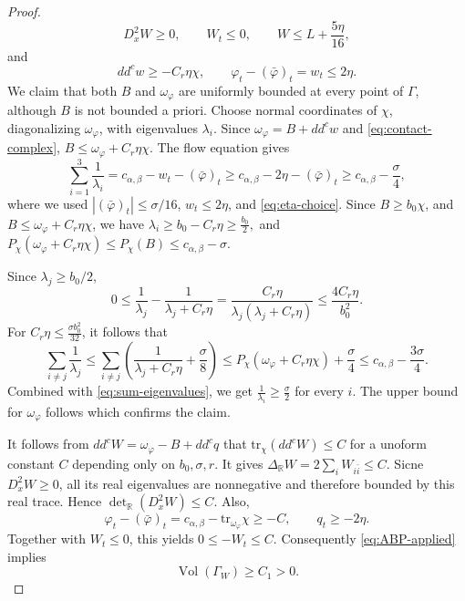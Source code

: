 \documentclass[reqno]{amsart}
\theoremstyle{remark}
\def\R{\mathbb{R}}
\def\tr{\text{tr}}
\newcommand{\ddc}{dd^c}
\newcommand{\cab}{c_{\alpha,\beta}}
\theoremstyle{plain}
\begin{document}
\begin{proof}
\begin{equation}
 D_x^2W\geq0,\qquad W_t\leq0,\qquad
 W\leq L+\frac{5\eta}{16},
\end{equation}
and
\begin{equation}\label{eq:contact-complex}
 \ddc w\geq-C_r\eta\chi,\qquad
 \varphi_t-(\bar{\varphi})_t=w_t\leq2\eta.
\end{equation}
We claim that both $B$ and $\omega_\varphi$ are uniformly bounded at every point of $\Gamma$, although $B$ is not bounded a priori.    Choose normal coordinates of $\chi$, diagonalizing $\omega_\varphi$, with eigenvalues $\lambda_i$. Since $\omega_\varphi=B+dd^c w$ and \eqref{eq:contact-complex}, $B\leq \omega_\varphi+C_r\eta\chi$. The flow equation gives \begin{equation}\label{eq:sum-eigenvalues}
\sum_{i=1}^3\frac{1}{\lambda_i}=\cab-w_t-(\bar{\varphi})_t\geq \cab-2\eta-(\bar{\varphi})_t\geq\cab-\frac{\sigma}{4},
\end{equation}where we used $|(\bar{\varphi})_t|\leq \sigma/16$, $w_t\leq 2\eta$, and \eqref{eq:eta-choice}. 
Since $B\geq b_0\chi$, and $B\leq \omega_\varphi+C_r\eta\chi$, we have $\lambda_i\geq b_0-C_r\eta\geq \frac{b_0}{2}, $ and $P_\chi(\omega_\varphi+C_r\eta\chi)\leq P_\chi(B)\leq\cab-\sigma.$ 

Since $\lambda_j\geq b_0/2$, \[
0\leq \frac{1}{\lambda_j}-\frac{1}{\lambda_j+C_r\eta}
=\frac{C_r\eta}{\lambda_j(\lambda_j+C_r\eta)}\leq \frac{4C_r\eta}{b_0^2}.\]
For $C_r\eta\leq \frac{\sigma b_0^2}{32}$, it follows that \[
\sum_{i\neq j}\frac{1}{\lambda_j}\leq \sum_{i\neq j}\left(\frac{1}{\lambda_j+C_r\eta}+\frac{\sigma}{8}\right)\leq P_\chi(\omega_\varphi+C_r\eta\chi)+\frac{\sigma}{4}\leq \cab-\frac{3\sigma}{4}.
\]
Combined with \eqref{eq:sum-eigenvalues}, we get $\frac{1}{\lambda_i}\geq \frac{\sigma}{2}$ for every $i$. The upper bound for $\omega_\varphi$ follows which confirms the claim. 

It follows from $dd^cW=\omega_\varphi-B+dd^cq$ that $\tr_\chi(dd^c W)\leq C$ for a unoform constant $C$ depending only on $b_0,\sigma,r$. It gives $\Delta_{\R}W=2\sum_iW_{i\bar i}\leq C$. Sicne $D^2_xW\geq 0$, all its real eigenvalues are nonnegative and therefore bounded by this real trace. Hence $\det_{\mathbb R}(D_x^2W)\leq C$. Also,  \[\varphi_t-(\bar{\varphi})_t=\cab-\tr_{\omega_\varphi}\chi\geq -C, \qquad q_t\geq -2\eta.\]
Together with $W_t\leq 0$, this yields $0\leq -W_t\leq C$. Consequently \eqref{eq:ABP-applied} implies
\begin{equation}\label{eq:contact-positive-volume}
 \operatorname{Vol}(\Gamma_W)\geq C_1>0.
\end{equation}


\end{proof}
\end{document}
